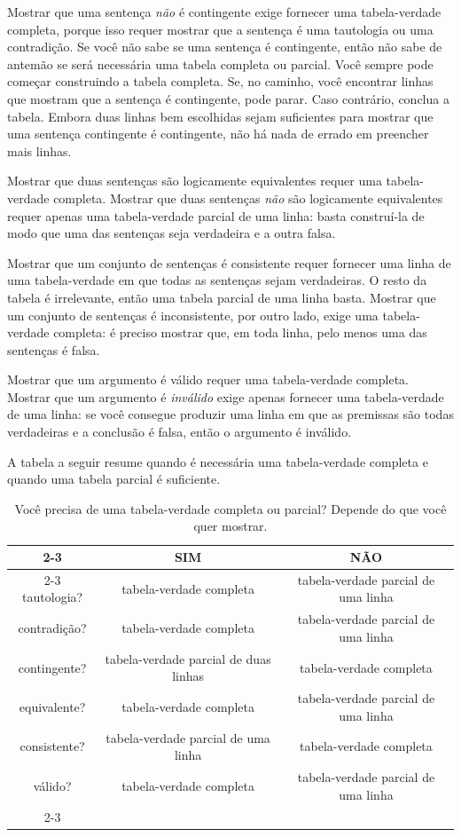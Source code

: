 Mostrar que uma sentença \emph{não} é contingente exige fornecer uma tabela-verdade completa, porque isso requer mostrar que a sentença é uma tautologia ou uma contradição. Se você não sabe se uma sentença é contingente, então não sabe de antemão se será necessária uma tabela completa ou parcial. Você sempre pode começar construindo a tabela completa. Se, no caminho, você encontrar linhas que mostram que a sentença é contingente, pode parar. Caso contrário, conclua a tabela. Embora duas linhas bem escolhidas sejam suficientes para mostrar que uma sentença contingente é contingente, não há nada de errado em preencher mais linhas.

Mostrar que duas sentenças são logicamente equivalentes requer uma tabela-verdade completa. Mostrar que duas sentenças \emph{não} são logicamente equivalentes requer apenas uma tabela-verdade parcial de uma linha: basta construí-la de modo que uma das sentenças seja verdadeira e a outra falsa.

Mostrar que um conjunto de sentenças é consistente requer fornecer uma linha de uma tabela-verdade em que todas as sentenças sejam verdadeiras. O resto da tabela é irrelevante, então uma tabela parcial de uma linha basta. Mostrar que um conjunto de sentenças é inconsistente, por outro lado, exige uma tabela-verdade completa: é preciso mostrar que, em toda linha, pelo menos uma das sentenças é falsa.

Mostrar que um argumento é válido requer uma tabela-verdade completa. Mostrar que um argumento é \emph{inválido} exige apenas fornecer uma tabela-verdade de uma linha: se você consegue produzir uma linha em que as premissas são todas verdadeiras e a conclusão é falsa, então o argumento é inválido.

A tabela a seguir resume quando é necessária uma tabela-verdade completa e quando uma tabela parcial é suficiente.

\begin{table}[h!]
\begin{center}
\begin{tabular}{c|c|c|}
\cline{2-3}
 & SIM & NÃO\\
\cline{2-3}
tautologia? & tabela-verdade completa & tabela-verdade parcial de uma linha\\
contradição? &  tabela-verdade completa  & tabela-verdade parcial de uma linha\\
contingente? & tabela-verdade parcial de duas linhas & tabela-verdade completa\\
equivalente? & tabela-verdade completa & tabela-verdade parcial de uma linha\\
consistente? & tabela-verdade parcial de uma linha & tabela-verdade completa\\
válido? & tabela-verdade completa & tabela-verdade parcial de uma linha\\
\cline{2-3}
\end{tabular}
\end{center}
\caption{Você precisa de uma tabela-verdade completa ou parcial? Depende do que você quer mostrar.}
\label{table.CompleteVsPartial}
\end{table}

